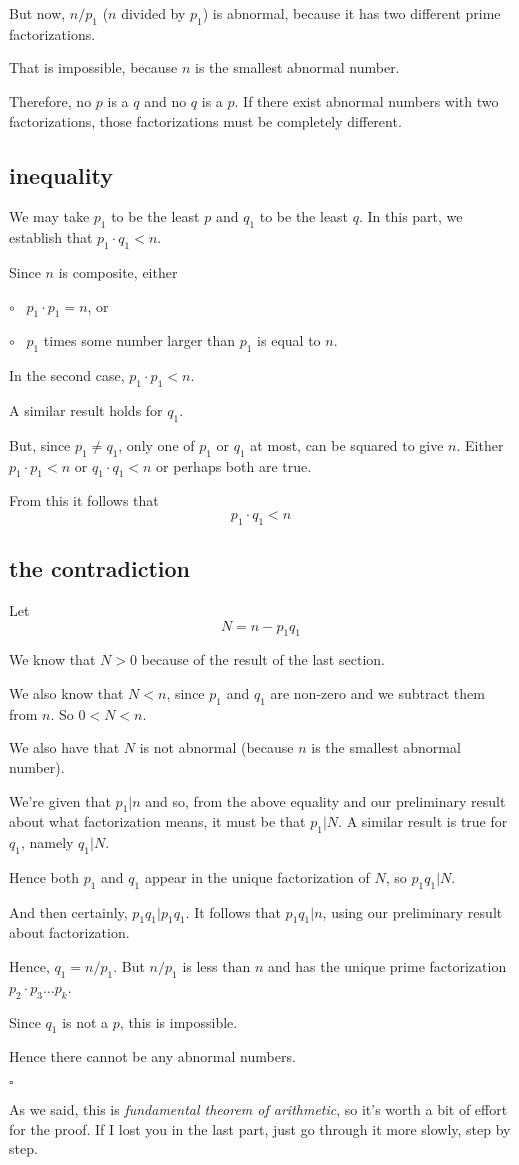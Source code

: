 \documentclass[11pt, oneside]{article}
\begin{document}
But now, $n/p_1$ ($n$ divided by $p_1$) is abnormal, because it has two different prime factorizations.  

That is impossible, because $n$ is the smallest abnormal number.

Therefore, no $p$ is a $q$ and no $q$ is a $p$.  If there exist abnormal numbers with two factorizations, those factorizations must be completely different.

\subsection*{inequality}

We may take $p_1$ to be the least $p$ and $q_1$ to be the least $q$.  In this part, we establish that $p_1 \cdot q_1 < n$.

Since $n$ is composite, either 

$\circ$ \ $p_1 \cdot p_1 = n$, or

$\circ$ \ $p_1$ times some number larger than $p_1$ is equal to $n$.

In the second case, $p_1 \cdot p_1 < n$.

A similar result holds for $q_1$.

But, since $p_1 \ne q_1$, only one of $p_1$ or $q_1$ at most, can be squared to give $n$.  Either $p_1 \cdot p_1 < n$ or $q_1 \cdot q_1 < n$ or perhaps both are true.

From this it follows that 
\[ p_1 \cdot q_1 < n \] 

\subsection*{the contradiction} 

Let 
\[ N = n - p_1 q_1 \]

We know that $N > 0$ because of the result of the last section.

We also know that $N < n$, since $p_1$ and $q_1$ are non-zero and we subtract them from $n$.  So $0 < N < n$.

We also have that $N$ is not abnormal (because $n$ is the smallest abnormal number).

We're given that $p_1 | n$ and so, from the above equality and our preliminary result about what factorization means, it must be that $p_1 | N$.  A similar result is true for $q_1$, namely $q_1 | N$.  

Hence both $p_1$ and $q_1$ appear in the unique factorization of $N$, so $p_1q_1 | N$.

And then certainly, $p_1 q_1 | p_1 q_1$.  It follows that $p_1 q_1 | n$, using our preliminary result about factorization.  

Hence, $q_1 = n/p_1$.  But $n/p_1$ is less than $n$ and has the unique prime factorization $p_2 \cdot p_3 \dots p_k$.

Since $q_1$ is not a $p$, this is impossible.  

Hence there cannot be any abnormal numbers.

$\square$

As we said, this is \emph{fundamental theorem of arithmetic}, so it's worth a bit of effort for the proof.  If I lost you in the last part, just go through it more slowly, step by step.
\end{document}
